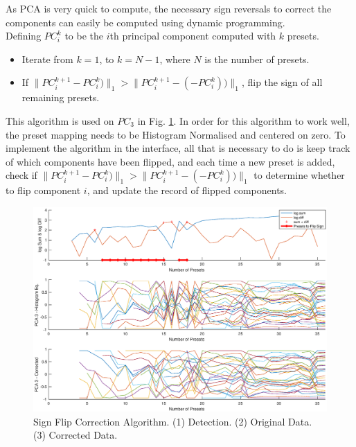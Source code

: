 \documentclass[11pt, oneside]{report}   	%
\begin{document}
As PCA is very quick to compute, the necessary sign reversals to correct the components can easily be computed using dynamic programming.\\ Defining $PC_i^k$ to be the $i$th principal component computed with $k$ presets.
\begin{itemize}
		\setlength\itemsep{-1.2em}
	\item 
Iterate from $k = 1$, to $k = N-1$, where $N$ is the number of presets.
	\item 
If $\|PC_i^{k+1} - PC_i^k)\|_1 > \|PC_i^{k+1} - (-PC_i^k))\|_1$,  flip the sign of all remaining presets.
\end{itemize}
This algorithm is used on $PC_3$ in Fig. \ref{fig:PCAnumPresets2}. In order for this algorithm to work well, the preset mapping needs to be Histogram Normalised and centered on zero. To implement the algorithm in the interface, all that is necessary to do is keep track of which components have been flipped, and each time a new preset is added, check if $\|PC_i^{k+1} - PC_i^k)\|_1 > \|PC_i^{k+1} - (-PC_i^k))\|_1$ to determine whether to flip component $i$, and update the record of flipped components. 

\begin{figure}
	\vspace{-0.5cm}
	\hspace{-40pt}
	\includegraphics[trim={0, 1cm, 0, 1.5cm}, clip, width = 7.3in]{PCAnumPresets2.eps}
	\vspace{-20pt}
	\caption{Sign Flip Correction Algorithm. (1) Detection. (2) Original Data. (3) Corrected Data.}
	\label{fig:PCAnumPresets2}
	\vspace{-10pt}
\end{figure}
\end{document}
